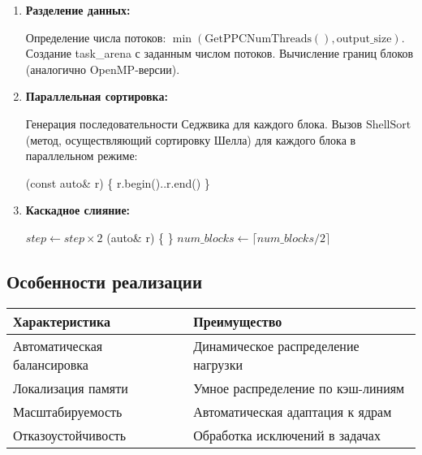 \documentclass[a4paper,14pt]{extarticle}
\begin{document}
\begin{enumerate}[leftmargin=*]
    \item \textbf{Разделение данных:}
    \begin{algorithmic}[1]
        \State Определение числа потоков: $\min(\text{GetPPCNumThreads}(), \text{output\_size})$.
        \State Создание {task\_arena} с заданным числом потоков.
        \State Вычисление границ блоков (аналогично OpenMP-версии).
    \end{algorithmic}

    \item \textbf{Параллельная сортировка:}
    \begin{algorithmic}[1]
        \State Генерация последовательности Седжвика для каждого блока.
        \State Вызов $\text{ShellSort}$ (метод, осуществляющий сортировку Шелла) для каждого блока в параллельном режиме:
        \begin{algorithmic}
            \State {}
            \State \quad [\&]({const auto\& r}) \{  r.begin()..r.end() \}
            \State {\});} 
        \end{algorithmic}
    \end{algorithmic}

    \item \textbf{Каскадное слияние:}
    \begin{algorithmic}[1]
            \State $step \gets step \times 2$
            \State {}
            \State \quad [\&]({auto\& r}) \{  \}
            \State {\});}
            \State $num\_blocks \gets \lceil num\_blocks / 2 \rceil$
        \EndWhile
    \end{algorithmic}
\end{enumerate}

\subsection*{Особенности реализации}
\begin{tabular}{|l|l|}
    \hline
    \textbf{Характеристика} & \textbf{Преимущество} \\ \hline
    Автоматическая балансировка & Динамическое распределение нагрузки \\ \hline
    Локализация памяти & Умное распределение по кэш-линиям \\ \hline
    Масштабируемость & Автоматическая адаптация к ядрам \\ \hline
    Отказоустойчивость & Обработка исключений в задачах \\ \hline
\end{tabular}
\end{document}
